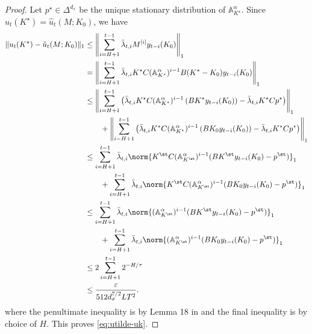 \begin{proof}
Let $p^{\star}\in\Delta^{d_x}$ be the unique stationary distribution of $\mathbb{A}_{K^{\star}}^{\alpha}$. Since $u_t(K^{\star})=\hat{u}_{t}(M;K_0)$, we have
\begin{align*}
\|u_{t}(K^{\star})-\tilde{u}_{t}(M;K_0)\|_1&\leq\left\|\sum_{i=H+1}^{t-1}\bar{\lambda}_{t,i}M^{[i]}y_{t-i}(K_0)\right\|_1\\
&=\left\|\sum_{i=H+1}^{t-1}\bar{\lambda}_{t,i}K^{\star}C(\mathbb{A}_{K^{\star}}^{\alpha})^{i-1}B(K^{\star}-K_0)y_{t-i}(K_0)\right\|_1\\
&\le \left\|\sum_{i=H+1}^{t-1}\left(\bar{\lambda}_{t,i}K^{\star}C(\mathbb{A}_{K^{\star}}^{\alpha})^{i-1}\left(BK^{\star}y_{t-i}(K_0)\right)-\bar{\lambda}_{t,i}K^{\star}Cp^{\star}\right)\right\|_1\\
&\qquad+ \left\|\sum_{i=H+1}^{t-1}\left(\bar{\lambda}_{t,i}K^{\star}C(\mathbb{A}_{K^{\star}}^{\alpha})^{i-1}\left(BK_0y_{t-i}(K_0)\right)-\bar{\lambda}_{t,i}K^{\star}Cp^{\star}\right)\right\|_1\\
&\leq \sum_{i=H+1}^{t-1} \bar\lambda_{t,i} \norm{K^\st C (\mathbb{A}_{K^\st}^\alpha)^{i-1}(BK^\st y_{t-i}(K_0) - p^\st)}_1 \\ 
&\qquad+ \sum_{i=H+1}^{t-1} \bar\lambda_{t,i} \norm{K^\st C (\mathbb{A}_{K^\st}^\alpha)^{i-1}(BK_0 y_{t-i}(K_0) - p^\st)}_1 \\
&\leq \sum_{i=H+1}^{t-1} \bar\lambda_{t,i} \norm{(\mathbb{A}_{K^\st}^\alpha)^{i-1}(BK^\st y_{t-i}(K_0) - p^\st)}_1 \\ 
&\qquad+ \sum_{i=H+1}^{t-1} \bar\lambda_{t,i} \norm{ (\mathbb{A}_{K^\st}^\alpha)^{i-1}(BK_0 y_{t-i}(K_0) - p^\st)}_1 \\
&\le 2\sum_{i=H+1}^{t-1} 2^{-H/\tau} \\
&\leq \frac{\eps}{512d_x^{7/2}LT^2}.
\end{align*}
where the penultimate inequality is by Lemma 18 in \citep{golowich2024online} and the final inequality is by choice of $H$. This proves \cref{eq:utilde-uk}. 


\end{proof}
